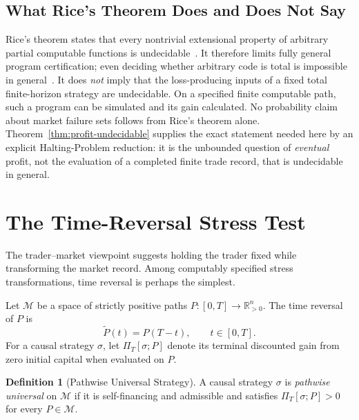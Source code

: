 \documentclass[aps,pra,reprint,superscriptaddress,amsmath,amssymb,floatfix]{revtex4-2}
\theoremstyle{plain}
\theoremstyle{definition}
\newtheorem{definition}{Definition}
\theoremstyle{remark}
\begin{document}
\subsection{What Rice's Theorem Does and Does Not Say}

Rice's theorem states that every nontrivial extensional property of arbitrary
partial computable functions is undecidable~\cite{Rice-1953}. It therefore
limits fully general program certification; even deciding whether arbitrary
code is total is impossible in general~\cite{turing-36}. It does \emph{not}
imply that the loss-producing inputs of a fixed total finite-horizon strategy
are undecidable. On a specified finite computable path, such a program can be
simulated and its gain calculated. No probability claim about market failure
sets follows from Rice's theorem alone. Theorem~\ref{thm:profit-undecidable}
supplies the exact statement needed here by an explicit Halting-Problem
reduction: it is the unbounded question of \emph{eventual} profit, not the
evaluation of a completed finite trade record, that is undecidable in general.

\section{The Time-Reversal Stress Test}
\label{sec:criterion}

The trader--market viewpoint suggests holding the trader fixed while
transforming the market record. Among computably specified stress
transformations, time reversal is perhaps the simplest.

Let \(\mathcal{M}\) be a space of strictly positive paths
\(P\colon[0,T]\to\mathbb{R}_{>0}^n\). The time reversal of \(P\) is
\begin{equation}
  \widetilde{P}(t)=P(T-t), \qquad t\in[0,T].
  \label{eq:timereversal}
\end{equation}
For a causal strategy \(\sigma\), let \(\Pi_T[\sigma;P]\) denote its terminal
discounted gain from zero initial capital when evaluated on \(P\).

\begin{definition}[Pathwise Universal Strategy]
\label{def:universal}
  A causal strategy \(\sigma\) is \emph{pathwise universal} on
  \(\mathcal{M}\) if it is self-financing and admissible and satisfies
  \(\Pi_T[\sigma;P]>0\) for every \(P\in\mathcal{M}\).
\end{definition}
\end{document}
